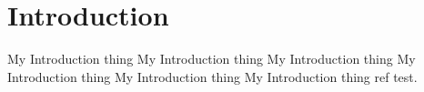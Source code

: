 \section{Introduction}

My Introduction thing
My Introduction thing
My Introduction thing
My Introduction thing
My Introduction thing
My Introduction thing \cite{van2007student} ref test.